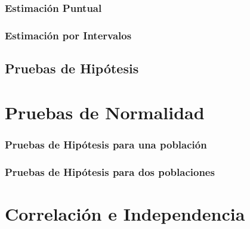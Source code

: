 \documentclass[a4paper, 12pt]{article}
\begin{document}
\subsubsection{Estimación Puntual}

\subsubsection{Estimación por Intervalos}

\subsection{Pruebas de Hipótesis}


\section{Pruebas de Normalidad}

\subsubsection{Pruebas de Hipótesis para una población}

\subsubsection{Pruebas de Hipótesis para dos poblaciones}

\newpage

\section{Correlación e Independencia}
\end{document}
